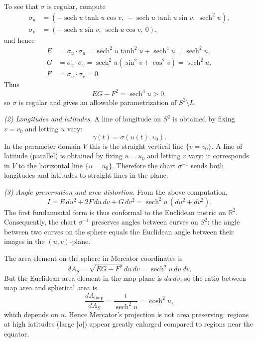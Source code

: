 \documentclass[12pt,a4paper]{article}
\theoremstyle{plain}
\theoremstyle{definition}      %
\begin{document}
To see that $\sigma$ is regular, compute
\[
\begin{aligned}
	\sigma_u &= (-\operatorname{sech}u\tanh u\cos v,\
	-\operatorname{sech}u\tanh u\sin v,\
	\operatorname{sech}^{2}u),\\[1mm]
	\sigma_v &= (-\operatorname{sech}u\sin v,\
	\operatorname{sech}u\cos v,\ 0),
\end{aligned}
\]
and hence
\[
\begin{aligned}
	E &= \sigma_u\cdot\sigma_u
	= \operatorname{sech}^{2}u\tanh^{2}u + \operatorname{sech}^{4}u
	= \operatorname{sech}^{2}u,\\
	G &= \sigma_v\cdot\sigma_v
	= \operatorname{sech}^{2}u(\sin^{2}v+\cos^{2}v)
	= \operatorname{sech}^{2}u,\\
	F &= \sigma_u\cdot\sigma_v = 0.
\end{aligned}
\]
Thus
\[
EG - F^{2} = \operatorname{sech}^{4}u > 0,
\]
so $\sigma$ is regular and gives an allowable parametrization of
$S^{2}\setminus L$.

\medskip
\emph{(2) Longitudes and latitudes.}
A line of longitude on $S^{2}$ is obtained by fixing $v=v_{0}$ and letting $u$
vary:
\[
\gamma(t) = \sigma(u(t),v_{0}).
\]
In the parameter domain $V$ this is the straight vertical line
$\{v=v_{0}\}$. A line of latitude (parallel) is obtained by fixing
$u=u_{0}$ and letting $v$ vary; it corresponds in $V$ to the horizontal line
$\{u=u_{0}\}$. Therefore the chart $\sigma^{-1}$ sends both longitudes and
latitudes to straight lines in the plane.

\medskip
\emph{(3) Angle preservation and area distortion.}
From the above computation,
\[
I = E\,du^{2} + 2F\,du\,dv + G\,dv^{2}
= \operatorname{sech}^{2}u\,(du^{2}+dv^{2}).
\]
The first fundamental form is thus conformal to the Euclidean metric on
$\mathbb{R}^{2}$. Consequently, the chart $\sigma^{-1}$ preserves angles
between curves on $S^{2}$: the angle between two curves on the sphere equals
the Euclidean angle between their images in the $(u,v)$-plane.

The area element on the sphere in Mercator coordinates is
\[
dA_{S} = \sqrt{EG-F^{2}}\,du\,dv
= \operatorname{sech}^{2}u\,du\,dv.
\]
But the Euclidean area element in the map plane is $du\,dv$, so the ratio
between map area and spherical area is
\[
\frac{dA_{\text{map}}}{dA_{S}} = \frac{1}{\operatorname{sech}^{2}u}
= \cosh^{2}u,
\]
which depends on $u$. Hence Mercator's projection is not area preserving:
regions at high latitudes (large $|u|$) appear greatly enlarged compared to
regions near the equator.
\end{document}
